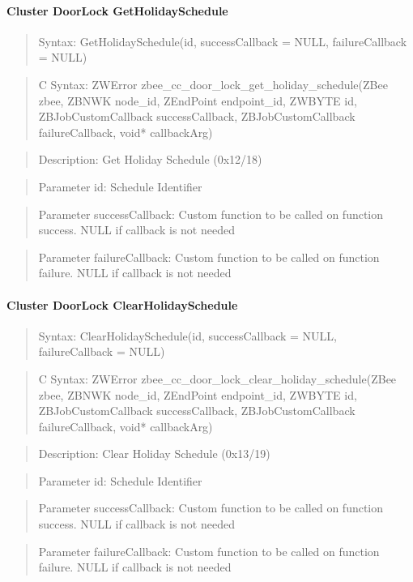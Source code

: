 \paragraph{Cluster DoorLock GetHolidaySchedule}
\begin{quote}Syntax: GetHolidaySchedule(id, successCallback = NULL, failureCallback = NULL)\end{quote}
\begin{quote}C Syntax: ZWError zbee\_cc\_door\_lock\_get\_holiday\_schedule(ZBee zbee, ZBNWK node\_id, ZEndPoint endpoint\_id, ZWBYTE id, ZBJobCustomCallback successCallback, ZBJobCustomCallback failureCallback, void* callbackArg)\end{quote}
\begin{quote}Description: Get Holiday Schedule (0x12/18)\end{quote}
\begin{quote}Parameter id: Schedule Identifier\end{quote}
\begin{quote}Parameter successCallback: Custom function to be called on function success. NULL if callback is not needed\end{quote}
\begin{quote}Parameter failureCallback: Custom function to be called on function failure. NULL if callback is not needed\end{quote}


\paragraph{Cluster DoorLock ClearHolidaySchedule}
\begin{quote}Syntax: ClearHolidaySchedule(id, successCallback = NULL, failureCallback = NULL)\end{quote}
\begin{quote}C Syntax: ZWError zbee\_cc\_door\_lock\_clear\_holiday\_schedule(ZBee zbee, ZBNWK node\_id, ZEndPoint endpoint\_id, ZWBYTE id, ZBJobCustomCallback successCallback, ZBJobCustomCallback failureCallback, void* callbackArg)\end{quote}
\begin{quote}Description: Clear Holiday Schedule (0x13/19)\end{quote}
\begin{quote}Parameter id: Schedule Identifier\end{quote}
\begin{quote}Parameter successCallback: Custom function to be called on function success. NULL if callback is not needed\end{quote}
\begin{quote}Parameter failureCallback: Custom function to be called on function failure. NULL if callback is not needed\end{quote}


